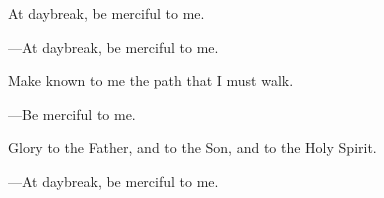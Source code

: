 \responsory
\begin{hangpar}

At daybreak, be merciful to me.

{\color{red}---\thinspace}At daybreak, be merciful to me.

\medskip Make known to me the path that I must walk.

{\color{red}---\thinspace}Be merciful to me.

\medskip Glory to the Father, and to the Son, and to the Holy Spirit.

{\color{red}---\thinspace}At daybreak, be merciful to me.
\end{hangpar}
